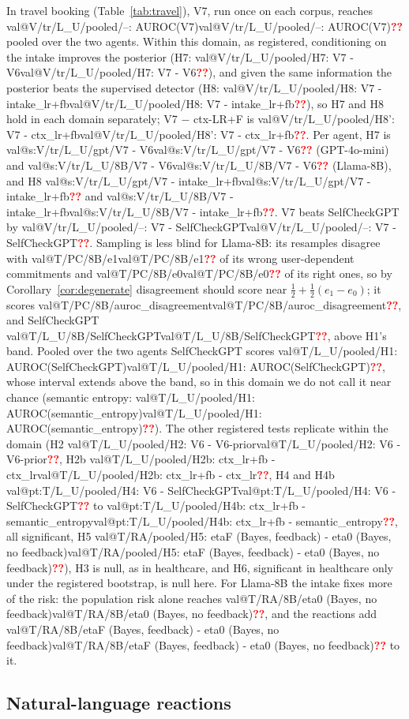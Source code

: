 \documentclass[10pt,a4paper,twocolumn]{article}
\makeatletter
\newcommand{\val}[1]{\ifcsname val@#1\endcsname\csname val@#1\endcsname\else\textcolor{red}{\textbf{??}}\fi}
\newif\iffinal \finaltrue
\newcommand{\chk}[1]{\iffinal#1\else\textcolor{blue}{#1}\fi}
\makeatother
\begin{document}
\chk{In travel booking (Table~\ref{tab:travel}), V7, run once on each corpus,
reaches \val{V/tr/L_U/pooled/--: AUROC(V7)} pooled over the two agents.
Within this domain, as registered, conditioning on the intake improves the
posterior (H7: \val{V/tr/L_U/pooled/H7: V7 - V6}), and given the same
information the posterior beats the supervised detector (H8:
\val{V/tr/L_U/pooled/H8: V7 - intake_lr+fb}), so H7 and H8 hold in each domain
separately; V7 $-$ ctx-LR+F is \val{V/tr/L_U/pooled/H8': V7 - ctx_lr+fb}. Per
agent, H7 is \val{s:V/tr/L_U/gpt/V7 - V6} (GPT-4o-mini) and
\val{s:V/tr/L_U/8B/V7 - V6} (Llama-8B), and H8 \val{s:V/tr/L_U/gpt/V7 - intake_lr+fb}
and \val{s:V/tr/L_U/8B/V7 - intake_lr+fb}. V7 beats SelfCheckGPT by
\val{V/tr/L_U/pooled/--: V7 - SelfCheckGPT}. Sampling is less blind for
Llama-8B: its resamples disagree with \val{T/PC/8B/e1} of its wrong
user-dependent commitments and \val{T/PC/8B/e0} of its right ones, so by
Corollary~\ref{cor:degenerate} disagreement should score near
$\tfrac12+\tfrac12(e_1-e_0)$; it scores \val{T/PC/8B/auroc_disagreement}, and
SelfCheckGPT \val{T/L_U/8B/SelfCheckGPT}, above H1's band. Pooled over the two agents SelfCheckGPT scores
\val{T/L_U/pooled/H1: AUROC(SelfCheckGPT)}, whose interval extends above
the band, so in this domain we do not call it near chance (semantic
entropy: \val{T/L_U/pooled/H1: AUROC(semantic_entropy)}). The other
registered tests replicate within the domain (H2
\val{T/L_U/pooled/H2: V6 - V6-prior}, H2b
\val{T/L_U/pooled/H2b: ctx_lr+fb - ctx_lr}, H4 and H4b
\val{pt:T/L_U/pooled/H4: V6 - SelfCheckGPT} to
\val{pt:T/L_U/pooled/H4b: ctx_lr+fb - semantic_entropy}, all significant, H5
\val{T/RA/pooled/H5: etaF (Bayes, feedback) - eta0 (Bayes, no feedback)}),
H3 is null, as in healthcare, and H6, significant in healthcare
only under the registered bootstrap, is null here. For Llama-8B the intake fixes more of the risk: the population risk alone reaches
\val{T/RA/8B/eta0 (Bayes, no feedback)}, and the reactions add
\val{T/RA/8B/etaF (Bayes, feedback) - eta0 (Bayes, no feedback)} to it.}

\subsection{Natural-language reactions}
\label{sec:exp-patient}
\end{document}
